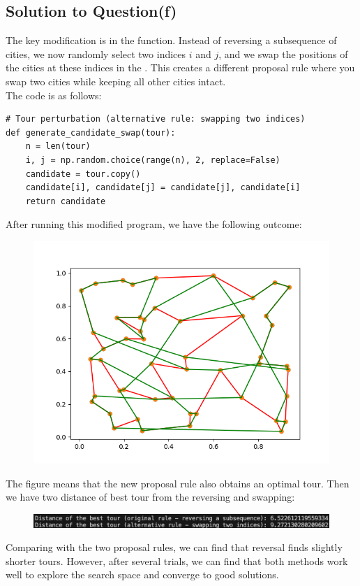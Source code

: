 \documentclass[a4paper]{article}
\begin{document}
\subsection{Solution to Question(f)}
The key modification is in the  function. Instead of reversing a subsequence of cities, we now randomly select two indices $i$ and $j$, and we swap the positions of the cities at these indices in the . This creates a different proposal rule where you swap two cities while keeping all other cities intact. \\
The code is as follows:
\begin{verbatim}
# Tour perturbation (alternative rule: swapping two indices)
def generate_candidate_swap(tour):
    n = len(tour)
    i, j = np.random.choice(range(n), 2, replace=False)
    candidate = tour.copy()
    candidate[i], candidate[j] = candidate[j], candidate[i]
    return candidate
\end{verbatim}
After running this modified program, we have the following outcome:
\begin{figure}[H]
    \centering
    \includegraphics[width=0.5\linewidth]{Figure_2.png}
\end{figure}
The figure means that the new proposal rule also obtains an optimal tour.
Then we have two distance of best tour from the reversing and swapping:
\begin{figure}[H]
    \centering
    \includegraphics[width=1\linewidth]{TSP（Comparison）.png}
\end{figure}
Comparing with the two proposal rules, we can find that reversal finds slightly shorter tours. However, after several trials, we can find that both methods work well to explore the search space and converge to good solutions.


\end{document}
